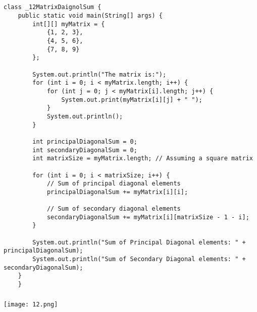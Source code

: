 \documentclass[12pt,a4paper]{article}
\begin{document}
\subsection{}
\begin{lstlisting}
class _12MatrixDaignolSum {
    public static void main(String[] args) {
        int[][] myMatrix = {
            {1, 2, 3},
            {4, 5, 6},
            {7, 8, 9}
        };
    
        System.out.println("The matrix is:");
        for (int i = 0; i < myMatrix.length; i++) {
            for (int j = 0; j < myMatrix[i].length; j++) {
                System.out.print(myMatrix[i][j] + " ");
            }
            System.out.println();
        }
    
        int principalDiagonalSum = 0;
        int secondaryDiagonalSum = 0;
        int matrixSize = myMatrix.length; // Assuming a square matrix
    
        for (int i = 0; i < matrixSize; i++) {
            // Sum of principal diagonal elements
            principalDiagonalSum += myMatrix[i][i];
    
            // Sum of secondary diagonal elements
            secondaryDiagonalSum += myMatrix[i][matrixSize - 1 - i];
        }
    
        System.out.println("Sum of Principal Diagonal elements: " + principalDiagonalSum);
        System.out.println("Sum of Secondary Diagonal elements: " + secondaryDiagonalSum);
    }
    }

\end{lstlisting}

\subsubsection{}
\begin{center}
    \texttt{[image: 12.png]}
\end{center}
\end{document}
